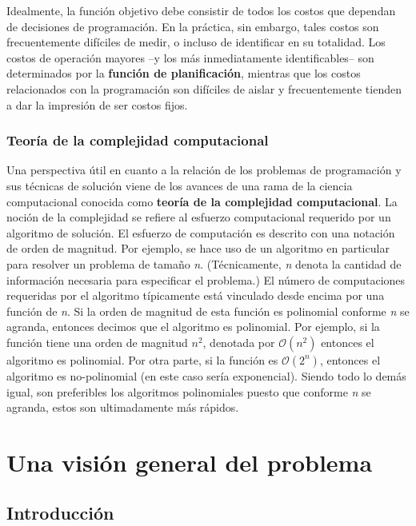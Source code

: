 \documentclass[draft,12pt,headsepline,footsepline,paper=letter]{scrreprt}
\newcommand{\BigO}{\ensuremath{\mathcal{O}}}%
\begin{document}
Idealmente, la función objetivo debe consistir de todos los costos que dependan de decisiones de programación. En la práctica, sin embargo, tales costos son frecuentemente difíciles de medir, o incluso de identificar en su totalidad. Los costos de operación mayores –y los más inmediatamente identificables– son determinados por la \textbf{función de planificación}, mientras que los costos relacionados con la programación son difíciles de aislar y frecuentemente tienden a dar la impresión de ser costos fijos.


\subsection{Teoría de la complejidad computacional} %
\label{teoria_complejidad_computacional}

Una perspectiva útil en cuanto a la relación de los problemas de programación y sus técnicas de solución viene de los avances de una rama de la ciencia computacional conocida como \textbf{teoría de la complejidad computacional}. La noción de la complejidad se refiere al esfuerzo computacional requerido por un algoritmo de solución. El esfuerzo de computación es descrito con una notación de orden de magnitud.
%
Por ejemplo, se hace uso de un algoritmo en particular para resolver un problema de tamaño \textit{n}. (Técnicamente, \textit{n} denota la cantidad de información necesaria para especificar el problema.) El número de computaciones requeridas por el algoritmo típicamente está vinculado desde encima por una función de \textit{n}. Si la orden de magnitud de esta función es polinomial conforme \textit{n} se agranda, entonces decimos que el algoritmo es polinomial.
%
Por ejemplo, si la función tiene una orden de magnitud $\textit{n}^2$, denotada por $\BigO(\textit{n}^2)$ entonces el algoritmo es polinomial. Por otra parte, si la función es $\BigO(2^\textit{n})$, entonces el algoritmo es no-polinomial (en este caso sería exponencial). Siendo todo lo demás igual, son preferibles los algoritmos polinomiales puesto que conforme \textit{n} se agranda, estos son ultimadamente más rápidos.

\chapter{Una visión general del problema}
\label{vision_general_problema}

\section{Introducción}
\label{introduccion_vision_general}
\end{document}

